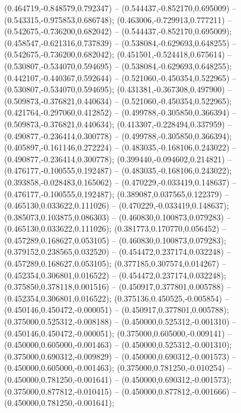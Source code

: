  (0.464719,-0.848579,0.792347) -- (0.544437,-0.852170,0.695009) -- (0.543315,-0.975853,0.686748);
 (0.463006,-0.729913,0.777211) -- (0.542675,-0.736200,0.682042) -- (0.544437,-0.852170,0.695009);
 (0.458547,-0.621316,0.737839) -- (0.538084,-0.629693,0.648255) -- (0.542675,-0.736200,0.682042);
 (0.451501,-0.524418,0.675614) -- (0.530807,-0.534070,0.594695) -- (0.538084,-0.629693,0.648255);
 (0.442107,-0.440367,0.592644) -- (0.521060,-0.450354,0.522965) -- (0.530807,-0.534070,0.594695);
 (0.431381,-0.367308,0.497900) -- (0.509873,-0.376821,0.440634) -- (0.521060,-0.450354,0.522965);
 (0.421764,-0.297060,0.412852) -- (0.499788,-0.305850,0.366394) -- (0.509873,-0.376821,0.440634);
 (0.413307,-0.228494,0.337959) -- (0.490877,-0.236414,0.300778) -- (0.499788,-0.305850,0.366394);
 (0.405897,-0.161146,0.272224) -- (0.483035,-0.168106,0.243022) -- (0.490877,-0.236414,0.300778);
 (0.399440,-0.094602,0.214821) -- (0.476177,-0.100555,0.192487) -- (0.483035,-0.168106,0.243022);
 (0.393858,-0.028483,0.165062) -- (0.470229,-0.033419,0.148637) -- (0.476177,-0.100555,0.192487);
 (0.389087,0.037565,0.122379) -- (0.465130,0.033622,0.111026) -- (0.470229,-0.033419,0.148637);
 (0.385073,0.103875,0.086303) -- (0.460830,0.100873,0.079283) -- (0.465130,0.033622,0.111026);
 (0.381773,0.170770,0.056452) -- (0.457289,0.168627,0.053105) -- (0.460830,0.100873,0.079283);
 (0.379152,0.238565,0.032520) -- (0.454472,0.237174,0.032248) -- (0.457289,0.168627,0.053105);
 (0.377185,0.307574,0.014267) -- (0.452354,0.306801,0.016522) -- (0.454472,0.237174,0.032248);
 (0.375850,0.378118,0.001516) -- (0.450917,0.377801,0.005788) -- (0.452354,0.306801,0.016522);
 (0.375136,0.450525,-0.005854) -- (0.450146,0.450472,-0.000051) -- (0.450917,0.377801,0.005788);
 (0.375000,0.525312,-0.008188) -- (0.450000,0.525312,-0.001310) -- (0.450146,0.450472,-0.000051);
 (0.375000,0.605000,-0.009141) -- (0.450000,0.605000,-0.001463) -- (0.450000,0.525312,-0.001310);
 (0.375000,0.690312,-0.009829) -- (0.450000,0.690312,-0.001573) -- (0.450000,0.605000,-0.001463);
 (0.375000,0.781250,-0.010254) -- (0.450000,0.781250,-0.001641) -- (0.450000,0.690312,-0.001573);
 (0.375000,0.877812,-0.010415) -- (0.450000,0.877812,-0.001666) -- (0.450000,0.781250,-0.001641);
